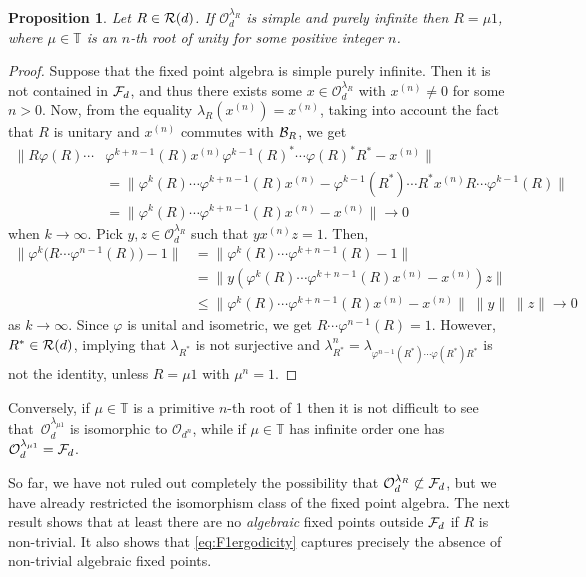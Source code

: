 \documentclass[12pt,a4paper]{amsart}
\numberwithin{equation}{section}
\newtheorem{proposition}[theorem]{Proposition}
\theoremstyle{remark}
\newcommand{\la}{\lambda}
\newcommand{\CO}[0]{\mathcal{O}} \newcommand{\CP}[0]{\mathcal{P}}
\begin{document}
\begin{proposition}\label{prop:simplepurelyinfinite}
	Let $R \in \mathcal{R}(d)$. If $\CO_d^{\lambda_R}$ is simple and purely infinite then $R= \mu 1$, where $\mu \in {\mathbb T}$ is an $n$-th root of unity for some positive integer $n$. 
\end{proposition}
\begin{proof}
	Suppose that the fixed point algebra is simple purely infinite. Then it is not contained in $\mathcal{F}_d$, and thus there exists some $x \in \CO_d^{\lambda_R}$ with $x^{(n)} \neq 0$ for some $n>0$. Now, from the equality $\lambda_R(x^{(n)}) = x^{(n)}$, taking into account the fact that $R$ is unitary and $x^{(n)}$ commutes with $\mathcal{B}_R$, we get
	\begin{align*}
		\|R \varphi(R) \cdots &\varphi^{k+n-1}(R) x^{(n)} \varphi^{k-1}(R)^* \cdots \varphi(R)^* R^* - x^{(n)} \| 
		\\
		&= 
		\|\varphi^k(R)\cdots\varphi^{k+n-1}(R)x^{(n)}
		-
		\varphi^{k-1}(R^*)\cdots R^*x^{(n)}R\cdots\varphi^{k-1}(R)\|
		\\
		&= 
		\|\varphi^k(R) \cdots \varphi^{k+n-1}(R)  x^{(n)} - x^{(n)} \| 
		\to 0
	\end{align*}
	when $k \to \infty$. Pick $y,z \in\CO_d^{\lambda_R}$ such that $y x^{(n)} z = 1$. Then,
	\begin{align*}
		\| \varphi^k \big(R \cdots \varphi^{n-1}(R) \big) - 1 \| 
		& = \| \varphi^k(R) \cdots \varphi^{k+n-1}(R) - 1 \| \\
		& = \| y (\varphi^k(R) \cdots \varphi^{k+n-1}(R)  x^{(n)} - x^{(n)})z \| \\ 
		& \leq \| \varphi^k(R) \cdots \varphi^{k+n-1}(R)  x^{(n)} - x^{(n)} \| \; \|y\| \; \| z\| 
		\longrightarrow 0 
	\end{align*}
	as $k \to \infty$. Since $\varphi$ is unital and isometric, we get $R \cdots \varphi^{n-1}(R) =1$.
	However, $R^* \in \mathcal{R}(d)$, implying that $\la_{R^*}$ is not surjective and $\lambda^n_{R^*} = \lambda_{\varphi^{n-1}(R^*) \cdots \varphi(R^*)R^*}$ is not the identity, unless $R = \mu 1$ with $\mu^n = 1$.
\end{proof}

Conversely, if $\mu \in {\mathbb T}$ is a primitive $n$-th root of 1 then it is not difficult to see that~$\CO_d^{\lambda_{\mu 1}}$ is isomorphic to $\CO_{d^n}$, while
if $\mu \in {\mathbb T}$ has infinite order one has $\CO_d^{\lambda_{\mu 1}} = \CF_d$.

 
So far, we have not ruled out completely  the possibility that $\CO_d^{\lambda_R} \not\subset \CF_d$, but we have already restricted the isomorphism class of the fixed point algebra. The next result shows that at least there are no {\em algebraic} fixed points outside $\mathcal{F}_d$ if $R$ is non-trivial. It also shows that \eqref{eq:F1ergodicity} captures precisely the absence of non-trivial algebraic fixed points.
\end{document}
